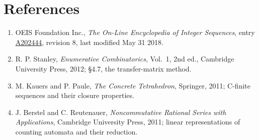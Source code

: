 \documentclass[11pt]{article}
\theoremstyle{definition}
\begin{document}
\section{References}

\begin{enumerate}

\item OEIS Foundation Inc., \emph{The On-Line Encyclopedia of Integer Sequences}, entry \href{https://oeis.org/A202444}{A202444}, revision 8, last modified May 31 2018.

\item R. P. Stanley, \emph{Enumerative Combinatorics}, Vol.~1, 2nd ed., Cambridge University Press, 2012; \S4.7, the transfer-matrix method.

\item M. Kauers and P. Paule, \emph{The Concrete Tetrahedron}, Springer, 2011; C-finite sequences and their closure properties.

\item J. Berstel and C. Reutenauer, \emph{Noncommutative Rational Series with Applications}, Cambridge University Press, 2011; linear representations of counting automata and their reduction.

\end{enumerate}
\end{document}
